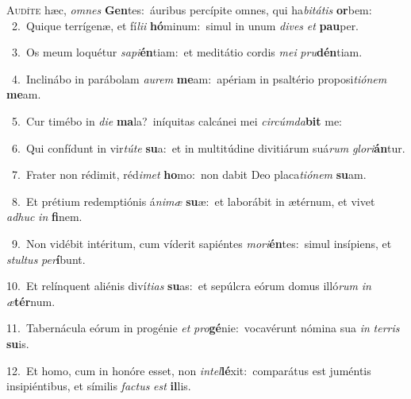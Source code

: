 \lettrine{\initial\textcolor{\initialcolor}{A}}{udíte} hæc, \textit{om}\-\textit{nes} \textbf{Gen}\-tes:~\star áuribus percípite omnes, qui ha\-\textit{bi}\-\textit{tá}\textit{tis} \textbf{or}\-bem:\\
{\numbfont\textcolor{\numbcolor}{~2.}}~Quique terrígenæ, et fí\-\textit{li}\-\textit{i} \textbf{hó}\-minum:~\star simul in unum \textit{di}\-\textit{ves} \textit{et} \textbf{pau}\-per.\par
{\numbfont\textcolor{\numbcolor}{~3.}}~Os meum loquétur \textit{sa}\-\textit{pi}\textbf{én}tiam:~\star et meditátio cordis \textit{me}\-\textit{i} \textit{pru}\-\textbf{dén}tiam.\par
{\numbfont\textcolor{\numbcolor}{~4.}}~Inclinábo in parábolam \textit{au}\-\textit{rem} \textbf{me}\-am:~\star apériam in psaltério proposi\-\textit{ti}\-\textit{ó}\textit{nem} \textbf{me}\-am.\par
{\numbfont\textcolor{\numbcolor}{~5.}}~Cur timébo in \textit{di}\-\textit{e} \textbf{ma}\-la?~\star iníquitas calcánei mei \textit{cir}\-\textit{cúm}\textit{da}\textbf{bit} me:\par
{\numbfont\textcolor{\numbcolor}{~6.}}~Qui confídunt in vir\-\textit{tú}\-\textit{te} \textbf{su}\-a:~\star et in multitúdine divitiárum suá\textit{rum} \textit{glo}\-\textit{ri}\textbf{án}tur.\par
{\numbfont\textcolor{\numbcolor}{~7.}}~Frater non rédimit, réd\-\textit{i}\-\textit{met} \textbf{ho}\-mo:~\star non dabit Deo placa\-\textit{ti}\-\textit{ó}\textit{nem} \textbf{su}\-am.\par
{\numbfont\textcolor{\numbcolor}{~8.}}~Et prétium redemptiónis á\-\textit{ni}\-\textit{mæ} \textbf{su}\-æ:~\star et laborábit in ætérnum, et vivet \textit{ad}\-\textit{huc} \textit{in} \textbf{fi}\-nem.\par
{\numbfont\textcolor{\numbcolor}{~9.}}~Non vidébit intéritum, cum víderit sapiéntes \textit{mo}\-\textit{ri}\textbf{én}tes:~\star simul insípiens, et \textit{stul}\-\textit{tus} \textit{per}\-\textbf{í}bunt.\par
{\numbfont\textcolor{\numbcolor}{10.}}~Et relínquent aliénis diví\-\textit{ti}\-\textit{as} \textbf{su}\-as:~\star et sepúlcra eórum domus illó\textit{rum} \textit{in} \textit{æ}\-\textbf{tér}num.\par
{\numbfont\textcolor{\numbcolor}{11.}}~Tabernácula eórum in progénie \textit{et} \textit{pro}\-\textbf{gé}nie:~\star vocavérunt nómina sua \textit{in} \textit{ter}\-\textit{ris} \textbf{su}\-is.\par
{\numbfont\textcolor{\numbcolor}{12.}}~Et homo, cum in honóre esset, non \textit{in}\-\textit{tel}\textbf{lé}xit:~\star comparátus est juméntis insipiéntibus, et símilis \textit{fac}\-\textit{tus} \textit{est} \textbf{il}\-lis.\par
